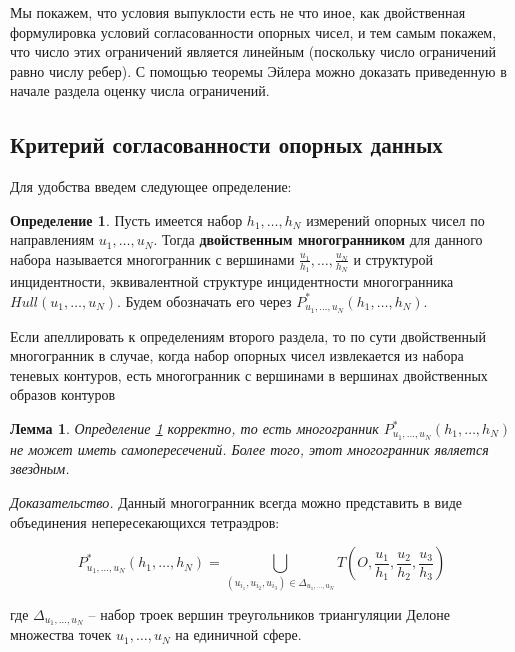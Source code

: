 \documentclass[a4paper, 12pt, titlepage]{article}
\theoremstyle{definition}
\newtheorem{SmartDefinition}{Определение}
\theoremstyle{plain}
\theoremstyle{plain}
\newtheorem{SmartLemma}{Лемма}
\begin{document}
Мы покажем, что условия выпуклости есть не что иное, как двойственная
формулировка условий согласованности опорных чисел, и тем самым покажем, что
число этих ограничений является линейным (поскольку число ограничений равно
числу ребер). С помощью теоремы Эйлера можно доказать приведенную в начале
раздела оценку числа ограничений.

\newpage
\subsection{Критерий согласованности опорных данных}
\label{sec:effictive-criterion:consistency-criterion}

Для удобства введем следующее определение:

\begin{SmartDefinition}
 \label{def:dual-polyhedron-for-support-vector}
 Пусть имеется набор $h_{1}, \ldots, h_{N}$ измерений опорных чисел по
 направлениям $u_{1}, \ldots, u_{N}$. Тогда \textbf{двойственным многогранником}
 для данного набора называется многогранник с вершинами $\frac{u_{1}}{h_{1}},
 \ldots, \frac{u_{N}}{h_{N}}$ и структурой инцидентности, эквивалентной
 структуре инцидентности многогранника $Hull(u_{1}, \ldots, u_{N})$. Будем
 обозначать его через $P^{*}_{u_{1}, \ldots, u_{N}}(h_{1}, \ldots, h_{N})$.
\end{SmartDefinition}

Если апеллировать к определениям второго раздела, то по сути двойственный
многогранник в случае, когда набор опорных чисел извлекается из набора теневых
контуров, есть многогранник с вершинами в вершинах двойственных образов
контуров	

\begin{SmartLemma}
 \label{lem:dual-polyhedron-for-support-vector-correctness}
 Определение \ref{def:dual-polyhedron-for-support-vector} корректно, то есть
 многогранник $P^{*}_{u_{1}, \ldots, u_{N}}(h_{1}, \ldots, h_{N})$ не может
 иметь самопересечений. Более того, этот многогранник является звездным.
\end{SmartLemma}

\begin{flushleft}
 \textit{Доказательство.} Данный многогранник всегда можно представить в виде
 объединения непересекающихся тетраэдров:

 \begin{equation}
  P^{*}_{u_{1}, \ldots, u_{N}}(h_{1}, \ldots, h_{N}) =
  \bigcup \limits_{(u_{i_{1}}, u_{i_{2}}, u_{i_{3}}) \in
  \Delta_{u_{1}, \ldots, u_{N}}}
  T \left(O, \frac{u_{1}}{h_{1}}, \frac{u_{2}}{h_{2}},
  \frac{u_{3}}{h_{3}}\right)
 \end{equation}

 где $\Delta_{u_{1}, \ldots, u_{N}}$ -- набор троек вершин треугольников
 триангуляции Делоне множества точек $u_{1}, \ldots, u_{N}$ на единичной сфере.

 \Square
\end{flushleft}
\end{document}
